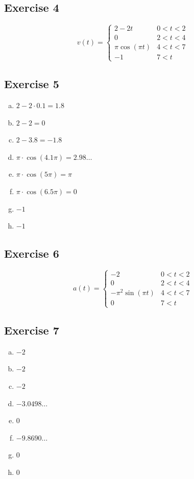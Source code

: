 \documentclass[11pt]{article}
\begin{document}
\subsection{Exercise 4}

\begin{equation*}
	v(t) =
	\begin{cases}
		2-2t & 0 < t < 2 \\
		0 & 2 < t < 4 \\
		\pi \cos(\pi t) & 4 < t < 7 \\
		-1 & 7 < t
	\end{cases}
\end{equation*}

\subsection{Exercise 5}

\begin{enumerate}[a.]
	\item $2-2 \cdot{} 0.1 = 1.8$
	\item $2-2 = 0$
	\item $2-3.8 = -1.8$
	\item $\pi \cdot \cos(4.1\pi) = 2.98 \dots $
	\item $\pi \cdot \cos(5\pi) = \pi$
	\item $\pi \cdot \cos(6.5\pi) = 0$
	\item $-1$
	\item $-1$
\end{enumerate}

\subsection{Exercise 6}

\begin{equation*}
	a(t) =
	\begin{cases}
		-2 & 0 < t < 2 \\
		0 & 2 < t < 4 \\
		-\pi^2 \sin(\pi t) & 4 < t < 7 \\
		0 & 7 < t
	\end{cases}
\end{equation*}

\subsection{Exercise 7}

\begin{enumerate}[a.]
	\item $-2$
	\item $-2$
	\item $-2$
	\item $-3.0498 \dots$
	\item $0$
	\item $-9.8690 \dots$
	\item $0$
	\item $0$
\end{enumerate}
\end{document}

